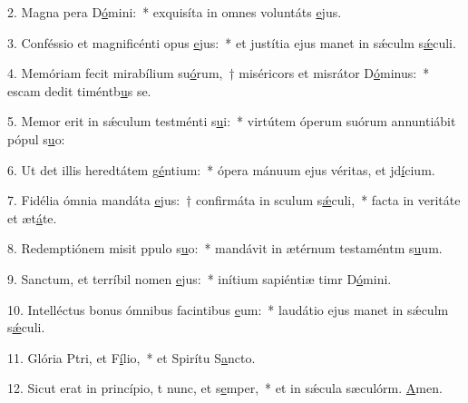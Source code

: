 2. Magna pera D\uline{ó}mini:~* exquisíta in omnes voluntáts \uline{e}jus.\par 
3. Conféssio et magnificénti opus \uline{e}jus:~* et justítia ejus manet in sǽculm s\uline{ǽ}culi.\par 
4. Memóriam fecit mirabílium su\uline{ó}rum,~† miséricors et misrátor D\uline{ó}minus:~* escam dedit timéntb\uline{u}s se.\par 
5. Memor erit in sǽculum testménti s\uline{u}i:~* virtútem óperum suórum annuntiábit pópul s\uline{u}o:\par 
6. Ut det illis heredtátem g\uline{é}ntium:~* ópera mánuum ejus véritas, et jd\uline{í}cium.\par 
7. Fidélia ómnia mandáta \uline{e}jus:~† confirmáta in sculum s\uline{ǽ}culi,~* facta in veritáte et æt\uline{á}te.\par 
8. Redemptiónem misit ppulo s\uline{u}o:~* mandávit in ætérnum testaméntm s\uline{u}um.\par 
9. Sanctum, et terríbil nomen \uline{e}jus:~* inítium sapiéntiæ timr D\uline{ó}mini.\par 
10. Intelléctus bonus ómnibus facintibus \uline{e}um:~* laudátio ejus manet in sǽculm s\uline{ǽ}culi.\par 
11. Glória Ptri, et F\uline{í}lio,~* et Spirítu S\uline{a}ncto.\par 
12. Sicut erat in princípio, t nunc, et s\uline{e}mper,~* et in sǽcula sæculórm. \uline{A}men.\par 
